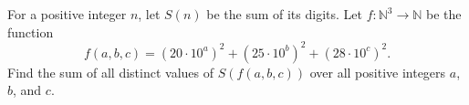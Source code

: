 For a positive integer $n$, let $S(n)$ be the sum of its digits. Let $f:\mathbb N^3\to\mathbb N$ be the function \[f(a,b,c)=(20\cdot10^a)^2+(25\cdot10^b)^2+(28\cdot10^c)^2.\]Find the sum of all distinct values of $S(f(a,b,c))$ over all positive integers $a$, $b$, and $c$.
